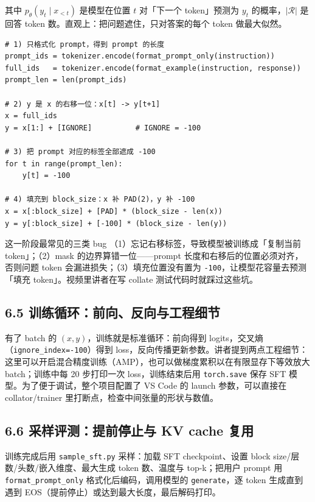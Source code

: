 其中 $p_\theta(y_t \mid x_{<t})$ 是模型在位置 $t$ 对「下一个 token」预测为 $y_t$ 的概率，$|\mathcal{R}|$ 是回答 token 数。直观上：把问题遮住，只对答案的每个 token 做最大似然。

\begin{lstlisting}[caption={collate 中的核心逻辑（按视频解释重写，细节以仓库代码为准）}]
# 1) 只格式化 prompt，得到 prompt 的长度
prompt_ids = tokenizer.encode(format_prompt_only(instruction))
full_ids   = tokenizer.encode(format_example(instruction, response))
prompt_len = len(prompt_ids)

# 2) y 是 x 的右移一位：x[t] -> y[t+1]
x = full_ids
y = x[1:] + [IGNORE]          # IGNORE = -100

# 3) 把 prompt 对应的标签全部遮成 -100
for t in range(prompt_len):
    y[t] = -100

# 4) 填充到 block_size：x 补 PAD(2)，y 补 -100
x = x[:block_size] + [PAD] * (block_size - len(x))
y = y[:block_size] + [-100] * (block_size - len(y))
\end{lstlisting}

\begin{warningbox}{这一阶段最常见的三类 bug}
（1）忘记右移标签，导致模型被训练成「复制当前 token」；（2）mask 的边界算错一位——prompt 长度和右移后的位置必须对齐，否则问题 token 会漏进损失；（3）填充位置没有置为 \texttt{-100}，让模型花容量去预测「填充 token」。视频里讲者在写 collate 测试代码时就踩过这些坑。
\end{warningbox}

\subsection{6.5 训练循环：前向、反向与工程细节}

有了 batch 的 $(x, y)$，训练就是标准循环：前向得到 logits，交叉熵（\texttt{ignore\_index=-100}）得到 loss，反向传播更新参数。讲者提到两点工程细节：这里可以开启混合精度训练（AMP），也可以做梯度累积以在有限显存下等效放大 batch；训练中每 20 步打印一次 loss，训练结束后用 \texttt{torch.save} 保存 SFT 模型。为了便于调试，整个项目配置了 VS Code 的 launch 参数，可以直接在 collator/trainer 里打断点，检查中间张量的形状与数值。

\subsection{6.6 采样评测：提前停止与 KV cache 复用}

训练完成后用 \texttt{sample\_sft.py} 采样：加载 SFT checkpoint、设置 block size/层数/头数/嵌入维度、最大生成 token 数、温度与 top-k；把用户 prompt 用 \texttt{format\_prompt\_only} 格式化后编码，调用模型的 \texttt{generate}，逐 token 生成直到遇到 EOS（提前停止）或达到最大长度，最后解码打印。

